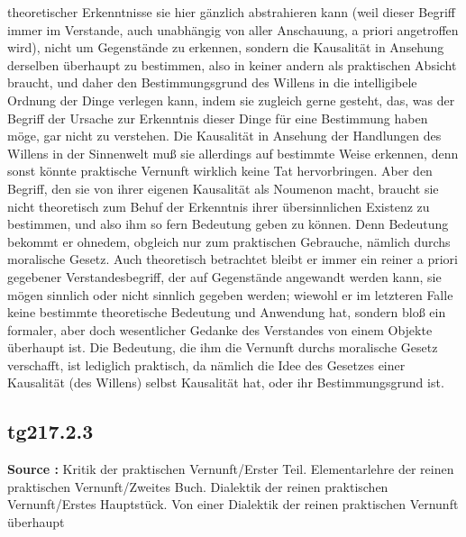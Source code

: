 \documentclass[a4paper,12pt,twoside]{book}
\begin{document}
theoretischer Erkenntnisse sie hier gänzlich abstrahieren kann (weil dieser Begriff immer im Verstande, auch unabhängig von aller Anschauung, a priori angetroffen wird), nicht um Gegenstände zu erkennen, sondern die Kausalität in Ansehung derselben überhaupt zu bestimmen, also in keiner andern als praktischen Absicht braucht, und daher den Bestimmungsgrund des Willens in die intelligibele Ordnung der Dinge verlegen kann, indem sie zugleich gerne gesteht, das, was der Begriff der Ursache zur Erkenntnis dieser Dinge für eine Bestimmung haben möge, gar nicht zu verstehen. Die Kausalität in Ansehung der Handlungen des Willens in der Sinnenwelt muß sie allerdings auf bestimmte Weise erkennen, denn sonst könnte praktische Vernunft wirklich keine Tat hervorbringen. Aber den Begriff, den sie von ihrer eigenen Kausalität als Noumenon macht, braucht sie nicht theoretisch zum Behuf der Erkenntnis ihrer übersinnlichen Existenz zu bestimmen, und also ihm so fern Bedeutung geben zu können. Denn Bedeutung bekommt  er ohnedem, obgleich nur zum praktischen Gebrauche, nämlich durchs moralische Gesetz. Auch theoretisch betrachtet bleibt er immer ein reiner a priori gegebener Verstandesbegriff, der auf Gegenstände angewandt werden kann, sie mögen sinnlich oder nicht sinnlich gegeben werden; wiewohl er im letzteren Falle keine bestimmte theoretische Bedeutung und Anwendung hat, sondern bloß ein formaler, aber doch wesentlicher Gedanke des Verstandes von einem Objekte überhaupt ist. Die Bedeutung, die ihm die Vernunft durchs moralische Gesetz verschafft, ist lediglich praktisch, da nämlich die Idee des Gesetzes einer Kausalität (des Willens) selbst Kausalität hat, oder ihr Bestimmungsgrund ist. 
	
	\subsection*{tg217.2.3} 
	\textbf{Source : }Kritik der praktischen Vernunft/Erster Teil. Elementarlehre der reinen praktischen Vernunft/Zweites Buch. Dialektik der reinen praktischen Vernunft/Erstes Hauptstück. Von einer Dialektik der reinen praktischen Vernunft überhaupt\\  
	
\end{document}
